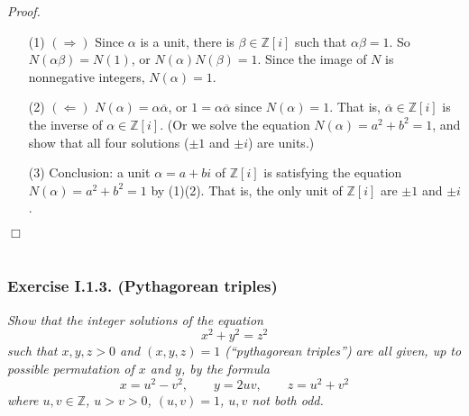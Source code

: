 \documentclass{article}
\begin{document}
\emph{Proof.}
\begin{enumerate}
\item[(1)]
  \emph{$(\Longrightarrow)$}
  Since $\alpha$ is a unit, there is $\beta \in \mathbb{Z}[i]$ such that
  $\alpha \beta = 1$.
  So $N(\alpha \beta) = N(1)$, or $N(\alpha) N(\beta) = 1$.
  Since the image of $N$ is nonnegative integers, $N(\alpha) = 1$.

\item[(2)]
  \emph{$(\Longleftarrow)$}
  $N(\alpha) = \alpha \overline{\alpha}$,
  or $1 = \alpha \overline{\alpha}$ since $N(\alpha) = 1$.
  That is, $\overline{\alpha} \in \mathbb{Z}[i]$ is
  the inverse of $\alpha \in \mathbb{Z}[i]$.
  (Or we solve the equation $N(\alpha) = a^2 + b^2 = 1$,
  and show that all four solutions ($\pm 1$ and $\pm i$) are units.)

\item[(3)]
  Conclusion: a unit $\alpha = a+bi$ of $\mathbb{Z}[i]$
  is satisfying the equation $N(\alpha) = a^2 + b^2 = 1$ by (1)(2).
  That is, the only unit of $\mathbb{Z}[i]$ are $\pm 1$ and $\pm i$.
\end{enumerate}
$\Box$ \\\\









\subsubsection*{Exercise I.1.3. (Pythagorean triples)}
\emph{Show that the integer solutions of the equation
\[
  x^2+y^2 = z^2
\]
such that $x, y, z > 0$ and $(x,y,z) = 1$ (``pythagorean triples'') are all given,
up to possible permutation of $x$ and $y$, by the formula
\[
  x = u^2-v^2,
  \qquad
  y = 2uv,
  \qquad
  z = u^2+v^2
\]
where $u, v \in \mathbb{Z}$, $u > v > 0$, $(u,v) = 1$, $u, v$ not both odd.} \\
\end{document}
